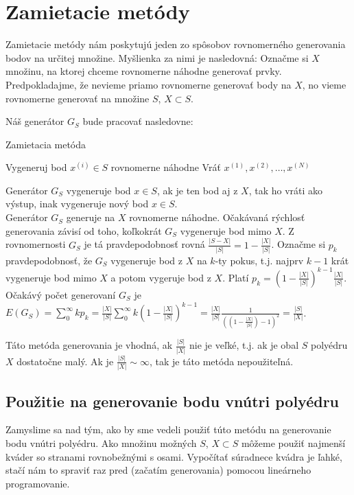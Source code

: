 \chapter{Zamietacie metódy}

Zamietacie metódy nám poskytujú jeden zo spôsobov rovnomerného generovania bodov na určitej množine.
Myšlienka za nimi je nasledovná: Označme si $X$ množinu, na ktorej chceme rovnomerne náhodne generovať prvky. Predpokladajme, že nevieme priamo rovnomerne generovať body na $X$, no vieme rovnomerne generovať na množine $S$, $X \subset S$.

Náš generátor $G_S$ bude pracovať nasledovne:

\begin{algorithm}[H]
	\caption{Zamietacia metóda}
	\label{zamietanie:basic}
	\begin{algorithmic}[1]
			\Repeat Vygeneruj bod $x^{(i)} \in S$ rovnomerne náhodne
		\EndFor
		\State Vráť ${x^{(1)},x^{(2)},\dots,x^{(N)}}$
	\end{algorithmic}
\end{algorithm}
Generátor $G_S$ vygeneruje bod $x \in S$, ak je ten bod aj z $X$, tak ho vráti ako výstup, inak vygeneruje nový bod $x \in S$.\\

Generátor $G_S$ generuje na $X$ rovnomerne náhodne. Očakávaná rýchlosť generovania závisí od toho, koľkokrát $G_S$ vygeneruje bod mimo $X$. Z rovnomernosti $G_S$ je tá pravdepodobnosť rovná $\frac{|S-X|}{|S|} = 1-\frac{|X|}{|S|}$. Označme si $p_k$ pravdepodobnosť, že $G_S$ vygeneruje bod z $X$ na $k$-ty pokus, t.j. najprv $k-1$ krát vygeneruje bod mimo $X$ a potom vygeruje bod z $X$. Platí $p_k= (1-\frac{|X|}{|S|})^{k-1}\frac{|X|}{|S|}$. Očakávý počet generovaní $G_S$ je $E(G_S)=\sum^{\infty}_{0}kp_k=\frac{|X|}{|S|} \sum^{\infty}_{0}k(1-\frac{|X|}{|S|})^{k-1}=\frac{|X|}{|S|} \frac{1}{((1-\frac{|X|}{|S|})-1)^2} = \frac{|S|}{|X|}$.

Táto metóda generovania je vhodná, ak $\frac{|S|}{|X|}$ nie je veľké, t.j. ak je obal $S$ polyédru $X$ dostatočne malý. Ak je $\frac{|S|}{|X|} \sim \infty$, tak je táto metóda nepoužiteľná.

\section{Použitie na generovanie bodu vnútri polyédru}

Zamyslime sa nad tým, ako by sme vedeli použiť túto metódu na generovanie bodu vnútri polyédru. Ako množinu možných $S$, $X \subset S$ môžeme použiť najmenší kváder so stranami rovnobežnými s osami. Vypočítať súradnece kvádra je ľahké, stačí nám to spraviť raz pred (začatím generovania) pomocou lineárneho programovanie.

